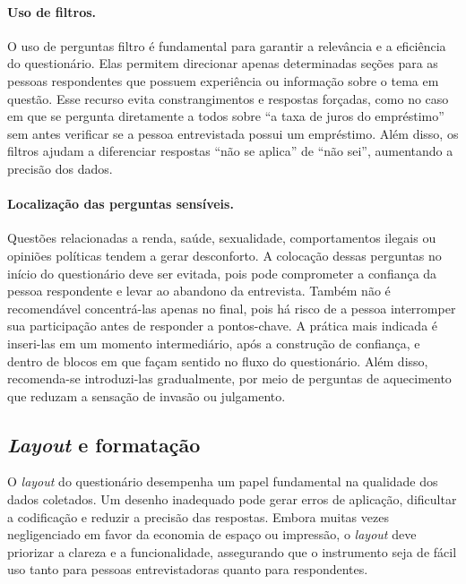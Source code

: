 \documentclass[12pt, a4paper, openany]{book}
\begin{document}
\paragraph{Uso de filtros.} O uso de perguntas filtro \'e fundamental para garantir a relev\^ancia e a efici\^encia do question\'ario. Elas permitem direcionar apenas determinadas se\c{c}\~oes para as pessoas respondentes que possuem experi\^encia ou informa\c{c}\~ao sobre o tema em quest\~ao. Esse recurso evita constrangimentos e respostas for\c{c}adas, como no caso em que se pergunta diretamente a todos sobre ``a taxa de juros do empr\'estimo'' sem antes verificar se a pessoa entrevistada possui um empr\'estimo. Al\'em disso, os filtros ajudam a diferenciar respostas ``n\~ao se aplica'' de ``n\~ao sei'', aumentando a precis\~ao dos dados.

\paragraph{Localiza\c{c}\~ao das perguntas sens\'iveis.} Quest\~oes relacionadas a renda, sa\'ude, sexualidade, comportamentos ilegais ou opini\~oes pol\'iticas tendem a gerar desconforto. A coloca\c{c}\~ao dessas perguntas no in\'icio do question\'ario deve ser evitada, pois pode comprometer a confian\c{c}a da pessoa respondente e levar ao abandono da entrevista. Tamb\'em n\~ao \'e recomend\'avel concentr\'a-las apenas no final, pois h\'a risco de a pessoa interromper sua participa\c{c}\~ao antes de responder a pontos-chave. A pr\'atica mais indicada \'e inseri-las em um momento intermedi\'ario, ap\'os a constru\c{c}\~ao de confian\c{c}a, e dentro de blocos em que fa\c{c}am sentido no fluxo do question\'ario. Al\'em disso, recomenda-se introduzi-las gradualmente, por meio de perguntas de aquecimento que reduzam a sensa\c{c}\~ao de invas\~ao ou julgamento.

\subsection{\textit{Layout} e formata\c{c}\~ao}

O \textit{layout} do question\'ario desempenha um papel fundamental na qualidade dos dados coletados. Um desenho inadequado pode gerar erros de aplica\c{c}\~ao, dificultar a codifica\c{c}\~ao e reduzir a precis\~ao das respostas. Embora muitas vezes negligenciado em favor da economia de espa\c{c}o ou impress\~ao, o \textit{layout} deve priorizar a clareza e a funcionalidade, assegurando que o instrumento seja de f\'acil uso tanto para pessoas entrevistadoras quanto para respondentes.
\end{document}
